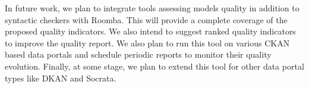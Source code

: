 \documentclass[onecolumn, crcready]{../../Util/LaTEX/iosart2c}
\begin{document}
In future work, we plan to integrate tools assessing models quality in addition to syntactic checkers with Roomba. This will provide a complete coverage of the proposed quality indicators. We also intend to suggest ranked quality indicators to improve the quality report. We also plan to run this tool on various CKAN based data portals and schedule periodic reports to monitor their quality evolution. Finally, at some stage, we plan to extend this tool for other data portal types like DKAN and Socrata.



\end{document}
